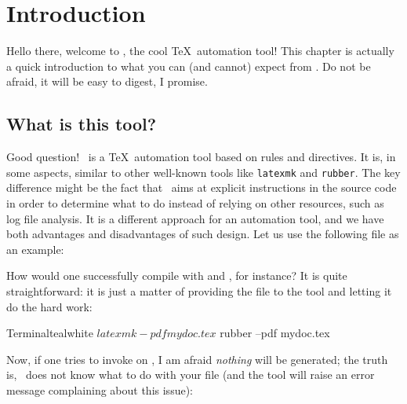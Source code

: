 \chapter{Introduction}
\label{chap:introduction}

Hello there, welcome to \arara, the cool \TeX\ automation tool! This chapter is actually a quick introduction to what you can (and cannot) expect from \arara. Do not be afraid, it will be easy to digest, I promise.

\section{What is this tool?}
\label{sec:whatisthistool}

Good question! \arara\ is a \TeX\ automation tool based on rules and directives. It is, in some aspects, similar to other well-known tools like \verb|latexmk| and \verb|rubber|. The key difference might be the fact that \arara\ aims at explicit instructions in the source code in order to determine what to do instead of relying on other resources, such as log file analysis. It is a different approach for an automation tool, and we have both advantages and disadvantages of such design. Let us use the following file  as an example:


How would one successfully compile  with  and , for instance? It is quite straightforward: it is just a matter of providing the file to the tool and letting it do the hard work:

\begin{codebox}{Terminal}{teal}{\icnote}{white}
$ latexmk -pdf mydoc.tex
$ rubber --pdf mydoc.tex
\end{codebox}

Now, if one tries to invoke  on , I am afraid \emph{nothing} will be generated; the truth is, \arara\ does not know what to do with your file (and the tool will raise an error message complaining about this issue):


